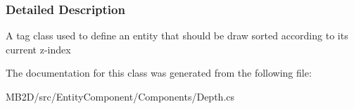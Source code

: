 \subsubsection{Detailed Description}
A tag class used to define an entity that should be draw sorted according to its current z-\/index 



The documentation for this class was generated from the following file\+:\begin{DoxyCompactItemize}
\item 
M\+B2\+D/src/\+Entity\+Component/\+Components/Depth.\+cs\end{DoxyCompactItemize}
